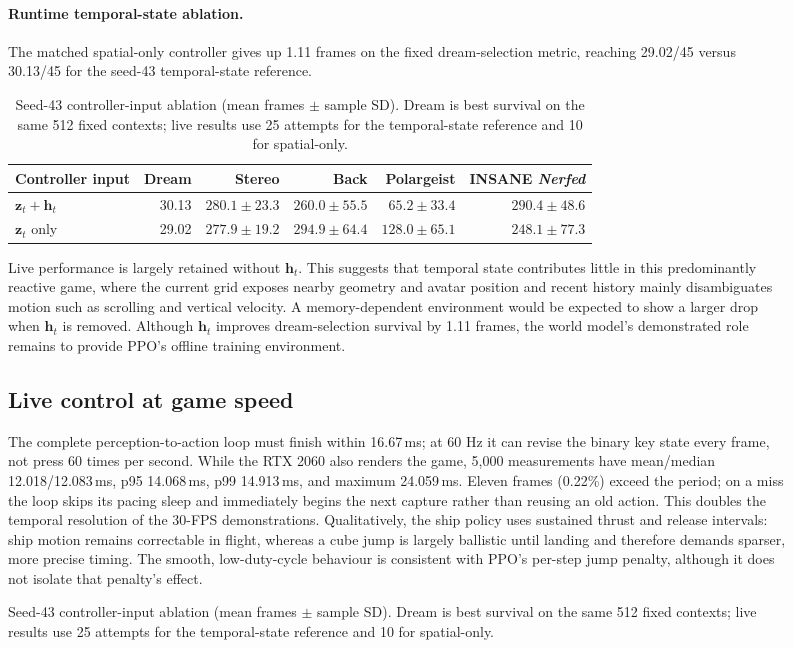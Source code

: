 \begin{figure}[!htbp]
\paragraph{Runtime temporal-state ablation.}
The matched spatial-only controller gives up 1.11 frames on the fixed dream-selection metric, reaching 29.02/45 versus 30.13/45 for the seed-43 temporal-state reference.

\begin{table}[H]
  \centering
  \footnotesize
  \setlength{\tabcolsep}{3pt}
  \caption{Seed-43 controller-input ablation (mean frames $\pm$ sample SD). Dream is best survival on the same 512 fixed contexts; live results use 25 attempts for the temporal-state reference and 10 for spatial-only.}
  \label{tab:temporal-ablation}
  \begin{tabular}{@{}lrrrrr@{}}
    \toprule
    Controller input & Dream & Stereo & Back & Polargeist & INSANE \textit{Nerfed} \\
    \midrule
    \(\mathbf z_t+\mathbf h_t\) & 30.13 & $280.1\pm23.3$ & $260.0\pm55.5$ & $65.2\pm33.4$ & $290.4\pm48.6$ \\
    \(\mathbf z_t\) only & 29.02 & $277.9\pm19.2$ & $294.9\pm64.4$ & $128.0\pm65.1$ & $248.1\pm77.3$ \\
    \bottomrule
  \end{tabular}
\end{table}

Live performance is largely retained without \(\mathbf h_t\).
This suggests that temporal state contributes little in this predominantly reactive game, where the current grid exposes nearby geometry and avatar position and recent history mainly disambiguates motion such as scrolling and vertical velocity.
A memory-dependent environment would be expected to show a larger drop when \(\mathbf h_t\) is removed.
Although \(\mathbf h_t\) improves dream-selection survival by 1.11 frames, the world model's demonstrated role remains to provide PPO's offline training environment.

\FloatBarrier
\subsection{Live control at game speed}
\label{sec:deployment-results}

The complete perception-to-action loop must finish within 16.67\,ms; at 60 Hz it can revise the binary key state every frame, not press 60 times per second.
While the RTX 2060 also renders the game, 5,000 measurements have mean/median 12.018/12.083\,ms, p95 14.068\,ms, p99 14.913\,ms, and maximum 24.059\,ms.
Eleven frames (0.22\%) exceed the period; on a miss the loop skips its pacing sleep and immediately begins the next capture rather than reusing an old action.
This doubles the temporal resolution of the 30-FPS demonstrations.
Qualitatively, the ship policy uses sustained thrust and release intervals: ship motion remains correctable in flight, whereas a cube jump is largely ballistic until landing and therefore demands sparser, more precise timing.
The smooth, low-duty-cycle behaviour is consistent with PPO's per-step jump penalty, although it does not isolate that penalty's effect.


\end{figure}
